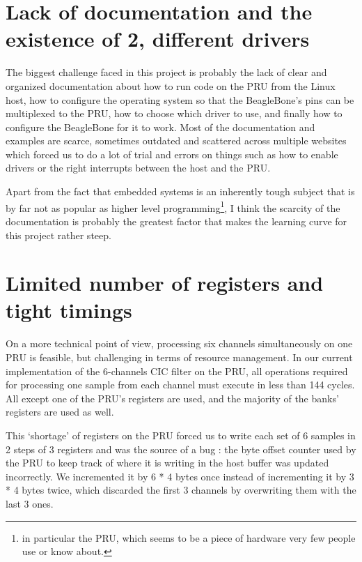 \documentclass[]{report}
\begin{document}
\hypertarget{lack-of-documentation-and-the-existence-of-2-different-drivers}{%
\section{Lack of documentation and the existence of 2, different
drivers}\label{lack-of-documentation-and-the-existence-of-2-different-drivers}}

The biggest challenge faced in this project is probably the lack of clear and organized documentation about how to run code on the PRU from the Linux host, how to configure the operating system so that the BeagleBone's pins can be multiplexed to the PRU, how to choose which driver to use, and finally how to configure the BeagleBone for it to work. Most of the documentation and examples are scarce, sometimes outdated and scattered across multiple websites which forced us to do a lot of trial and errors on things such as how to enable drivers or the right interrupts between the host and the PRU.

Apart from the fact that embedded systems is an inherently tough subject that is by far not as popular as higher level programming\footnote{in particular the PRU, which seems to be a piece of hardware very few people use or know about.}, I think the scarcity of the documentation is probably the greatest factor that makes the learning curve for this project rather steep.

\hypertarget{limited-number-of-registers-and-tight-timings}{%
\section{Limited number of registers and tight
timings}\label{limited-number-of-registers-and-tight-timings}}

On a more technical point of view, processing six channels simultaneously on one PRU is feasible, but challenging in terms of resource management. In our current implementation of the 6-channels CIC filter on the PRU, all operations required for processing one sample from each channel must execute in less than 144 cycles. All except one of the PRU's registers are used, and the majority of the banks' registers are used as well.

This `shortage' of registers on the PRU forced us to write each set of 6 samples in 2 steps of 3 registers and was the source of a bug : the byte offset counter used by the PRU to keep track of where it is writing in the host buffer was updated incorrectly. We incremented it by 6 * 4 bytes once instead of incrementing it by 3 * 4 bytes twice, which discarded the first 3 channels by overwriting them with the last 3 ones.
\end{document}

